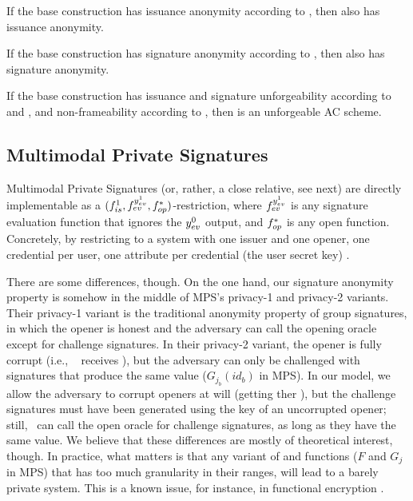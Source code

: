 \begin{theorem}
  If the base \CUASGen construction has issuance anonymity according to
  , then \CUASDAC also has issuance anonymity.
\end{theorem}

\begin{theorem}
  If the base \CUASGen construction has signature anonymity according to
  , then \CUASDAC also has signature anonymity.
\end{theorem}

\begin{theorem}
  If the base \CUASGen construction has issuance and signature unforgeability
  according to  and , and
  non-frameability according to , then \CUASAC is an
  unforgeable AC scheme.
\end{theorem}

\subsection{Multimodal Private Signatures}
\label{ssec:related-models-mps}

Multimodal Private Signatures (or, rather, a close relative, see next) are
directly implementable as a $(f_{is}^1,f_{ev}^{y_{ev}^1},
f_{op}^{\ast})$-\CUASGen restriction, where $f_{ev}^{y_{ev}^1}$ is any signature
evaluation function that ignores the $y_{ev}^0$ output, and $f_{op}^{\ast}$ is
any open function. Concretely, by restricting to a system with one issuer and
one opener, one credential per user, one attribute per credential (the user
secret key)%
.

There are some differences, though. On the one hand, our signature anonymity
property is somehow in the middle of MPS's privacy-1 and privacy-2 variants.
Their privacy-1 variant is the traditional anonymity property of group
signatures, in which the opener is honest and the adversary can call the opening
oracle except for challenge signatures. In their privacy-2 variant, the opener
is fully corrupt (i.e., \adv~ receives \osk), but the adversary can only be
challenged with signatures that produce the same \yinsp value ($G_{j_b}(id_b)$
in MPS). In our \UAS model, we allow the adversary to corrupt openers at will
(getting ther \osk), but the challenge signatures must have been generated using
the key of an uncorrupted opener; still, \adv~can call the open oracle for
challenge signatures, as long as they have the same \yinsp value. We believe
that these differences are mostly of theoretical interest, though. In practice,
what matters is that any variant of \feval and \finsp functions ($F$ and $G_j$
in MPS) that has too much granularity in their ranges, will lead to a barely
private system. This is a known issue, for instance, in functional encryption
\needcite.


